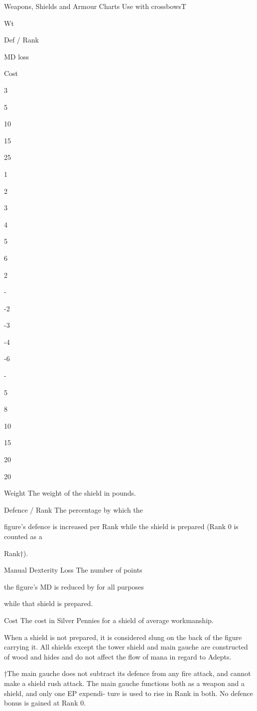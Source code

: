 \begin{Table}{Weapons, Shields and Armour Charts}
Use with crossbowsT 

Wt 

Def / Rank 

MD loss 

Cost 

3 

5 

10 

15 

25 

1 

2%

3%

4%

5%

6%

2%

- 

-2 

-3 

-4 

-6 

- 

5 

8 

10 

15 

20 

20 

 
Weight The weight of the shield in pounds. 
 
Defence  /  Rank  The  percentage  by  which  the 
 
figure’s defence is increased per Rank while the 
shield  is  prepared  (Rank  0  is  counted  as  a 
 
Rank†). 
 
Manual  Dexterity  Loss  The  number  of  points 
 
the  figure’s  MD  is  reduced  by  for  all  purposes 
 
while that shield is prepared. 

 
Cost  The  cost  in  Silver  Pennies  for  a  shield  of 
average workmanship. 
 

When  a  shield  is  not  prepared,  it  is  considered 
slung  on  the  back  of  the  figure  carrying  it.  All 
shields except the tower shield and main gauche 
are  constructed  of  wood  and  hides  and  do  not 
affect the flow of mana in regard to Adepts. 

†The  main  gauche  does  not  subtract  its  defence 
from  any  fire  attack,  and  cannot  make  a  shield 
rush attack. The main gauche functions both as a 
weapon  and  a  shield,  and  only  one  EP  expendi-
ture  is  used  to  rise  in  Rank  in  both.  No  defence 
bonus is gained at Rank 0. 



\end{Table}
